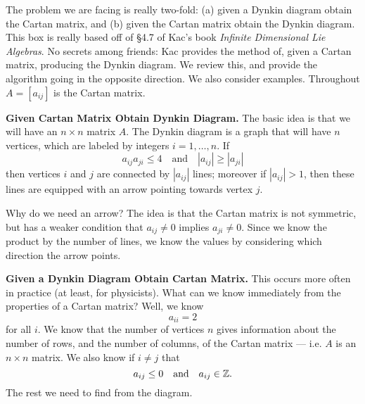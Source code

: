 \begin{framed}
\bigskip
\noindent{}The problem we are facing is really two-fold: (a)
given a Dynkin diagram obtain the Cartan matrix, and (b) given
the Cartan matrix obtain the Dynkin diagram. This box is really
based off of \S4.7 of Kac's book \emph{Infinite Dimensional Lie Algebras}.
No secrets among friends: Kac provides the method of, given a
Cartan matrix, producing the Dynkin diagram. We review this, and
provide the algorithm going in the opposite direction. We also
consider examples. Throughout $A=[a_{ij}]$ is the Cartan matrix.

\medskip
\noindent\textbf{Given Cartan Matrix Obtain Dynkin Diagram.}\enspace
The basic idea is that we will have an $n\times n$ matrix
$A$. The Dynkin diagram is a graph that will have $n$
vertices, which are labeled by integers $i=1,\dots,n$. If
\begin{equation}
a_{ij}a_{ji}\leq4\quad\mbox{and}\quad |a_{ij}|\geq|a_{ji}|
\end{equation}
then vertices $i$ and $j$ are connected by $|a_{ij}|$ lines;
moreover if $|a_{ij}|>1$, then these lines are equipped with an
arrow pointing towards vertex $j$. 

Why do we need an arrow? The idea is that the Cartan matrix is
not symmetric, but has a weaker condition that $a_{ij}\not=0$
implies $a_{ji}\not=0$. Since we know the product by the number
of lines, we know the values by considering which direction the
arrow points.

\medskip
\noindent\textbf{Given a Dynkin Diagram Obtain Cartan Matrix.}\enspace
This occurs more often in practice (at least, for
physicists). What can we know immediately from the properties of
a Cartan matrix? Well, we know
\begin{equation}
a_{ii} = 2
\end{equation}
for all $i$. We know that the number of vertices $n$ gives
information about the number of rows, and the number of columns,
of the Cartan matrix --- i.e. $A$ is an $n\times n$ matrix. We
also know if $i\not=j$ that
\begin{equation}
a_{ij}\leq0\quad\mbox{and}\quad a_{ij}\in\Bbb{Z}.
\end{equation}
The rest we need to find from the diagram.


\end{framed}
